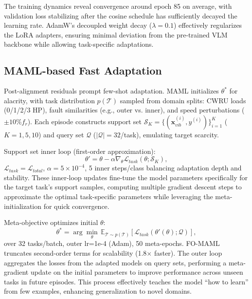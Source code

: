 The training dynamics reveal convergence around epoch 85 on average, with validation loss stabilizing after the cosine schedule has sufficiently decayed the learning rate. AdamW's decoupled weight decay ($\lambda=0.1$) effectively regularizes the LoRA adapters, ensuring minimal deviation from the pre-trained VLM backbone while allowing task-specific adaptations.

\subsection{MAML-based Fast Adaptation}
\label{subsec:maml_adaptation}

Post-alignment residuals prompt few-shot adaptation. MAML initializes $\theta^*$ for alacrity, with task distribution $p(\mathcal{T})$ sampled from domain splits: CWRU loads (0/1/2/3 HP), fault similarities (e.g., outer vs. inner), and speed perturbations ($\pm 10\% f_r$). Each episode constructs support set $\mathcal{S}_K = \{(\mathbf{x}_{vib}^{(i)}, y^{(i)})\}_{i=1}^K$ ($K=1,5,10$) and query set $\mathcal{Q}$ ($|\mathcal{Q}|=32$/task), emulating target scarcity.

Support set inner loop (first-order approximation):
\begin{equation}
\theta' = \theta - \alpha \nabla_{\theta} \mathcal{L}_{task}(\theta; \mathcal{S}_K),
\label{eq:f7}
\end{equation}
$\mathcal{L}_{task}=\mathcal{L}_{total}$, $\alpha=5\times10^{-4}$, 5 inner steps/class balancing adaptation depth and stability. These inner-loop updates fine-tune the model parameters specifically for the target task's support samples, computing multiple gradient descent steps to approximate the optimal task-specific parameters while leveraging the meta-initialization for quick convergence.

Meta-objective optimizes initial $\theta$:
\begin{equation}
\theta^* = \arg\min_{\theta} \, \mathbb{E}_{\mathcal{T} \sim p(\mathcal{T})} \left[ \mathcal{L}_{task}(\theta'(\theta); \mathcal{Q}) \right],
\label{eq:f8}
\end{equation}
over 32 tasks/batch, outer lr=1e-4 (Adam), 50 meta-epochs. FO-MAML truncates second-order terms for scalability (1.8$\times$ faster). The outer loop aggregates the losses from the adapted models on query sets, performing a meta-gradient update on the initial parameters to improve performance across unseen tasks in future episodes. This process effectively teaches the model ``how to learn'' from few examples, enhancing generalization to novel domains.

